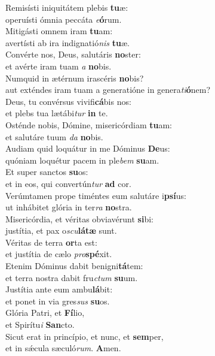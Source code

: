 \evenverse Remisísti iniquitátem plebis \textbf{tu}æ:~\*\\
\evenverse operuísti ómnia peccáta \textit{e}\textbf{ó}rum.\\
\oddverse Mitigásti omnem iram \textbf{tu}am:~\*\\
\oddverse avertísti ab ira indignatió\textit{nis} \textbf{tu}æ.\\
\evenverse Convérte nos, Deus, salutáris \textbf{no}ster:~\*\\
\evenverse et avérte iram tuam \textit{a} \textbf{no}bis.\\
\oddverse Numquid in ætérnum irascéris \textbf{no}bis?~\*\\
\oddverse aut exténdes iram tuam a generatióne in genera\textit{ti}\textbf{ó}nem?\\
\evenverse Deus, tu convérsus vivifi\textbf{cá}bis nos:~\*\\
\evenverse et plebs tua lætábi\textit{tur} \textbf{in} te.\\
\oddverse Osténde nobis, Dómine, misericórdiam \textbf{tu}am:~\*\\
\oddverse et salutáre tuum \textit{da} \textbf{no}bis.\\
\evenverse Audiam quid loquátur in me Dóminus \textbf{De}us:~\*\\
\evenverse quóniam loquétur pacem in ple\textit{bem} \textbf{su}am.\\
\oddverse Et super sanctos \textbf{su}os:~\*\\
\oddverse et in eos, qui convertún\textit{tur} \textbf{ad} cor.\\
\evenverse Verúmtamen prope timéntes eum salutáre i\textbf{psí}us:~\*\\
\evenverse ut inhábitet glória in ter\textit{ra} \textbf{no}stra.\\
\oddverse Misericórdia, et véritas obviavérunt \textbf{si}bi:~\*\\
\oddverse justítia, et pax o\textit{scu}\textbf{lá}\textbf{tæ} sunt.\\
\evenverse Véritas de terra \textbf{or}ta est:~\*\\
\evenverse et justítia de cælo \textit{pro}\textbf{spé}xit.\\
\oddverse Etenim Dóminus dabit benigni\textbf{tá}tem:~\*\\
\oddverse et terra nostra dabit fru\textit{ctum} \textbf{su}um.\\
\evenverse Justítia ante eum ambu\textbf{lá}bit:~\*\\
\evenverse et ponet in via gres\textit{sus} \textbf{su}os.\\
\oddverse Glória Patri, et \textbf{Fí}lio,~\*\\
\oddverse et Spirítu\textit{i} \textbf{San}cto.\\
\evenverse Sicut erat in princípio, et nunc, et \textbf{sem}per,~\*\\
\evenverse et in sǽcula sæculó\textit{rum}. \textbf{A}men.\\
